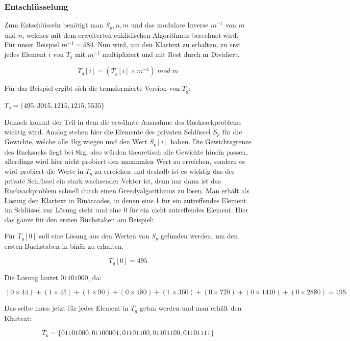 \documentclass[a4paper,12pt,titlepage]{article}
\begin{document}
\subsubsection{Entschlüsselung}
Zum Entschlüsseln benötigt man $S_p,n,m$ und das modulare Inverse $m^{-1}$ von $m$ und $n$, welches mit dem erweiterten euklidischen Algorithmus berechnet wird.
Für unser Beispiel $m^{-1} = 584$.
Nun wird, um den Klartext zu erhalten, zu erst jedes Element $i$ von $T_g$ mit $m^{-1}$ multipliziert und mit Rest durch m Dividiert.
\begin{center}
\[T_g[i] = (T_g[i] \times m^{-1})\; mod \; m\]
\end{center}
Für das Beispiel ergibt sich die transformierte Version von $T_g$:
\begin{center}
$T_g=\{495,3015,1215,1215,5535\}$
\end{center}
Danach kommt der Teil in dem die erwähnte Ausnahme des Rucksackproblems wichtig wird.
Analog stehen hier die Elemente des privaten Schlüssel $S_p$ für die Gewichte, welche alle 1kg wiegen und den Wert $S_p[i]$ haben. Die Gewichtsgrenze des Rucksacks liegt bei 8kg, also würden theoretisch alle Gewichte hinein passen, allerdings wird hier nicht probiert den maximalen Wert zu erreichen, sondern es wird probiert die Werte in $T_g$ zu erreichen und deshalb ist es wichtig das der private Schlüssel ein stark wachsender Vektor ist, denn nur dann ist das Rucksackproblem schnell durch einen Greedyalgorithmus zu lösen. Man erhält als Lösung den Klartext in Binärcodes, in denen eine 1 für ein zutreffendes Element im Schlüssel zur Lösung steht und eine 0 für ein nicht zutreffendes Element. \newline Hier das ganze für den ersten Buchstaben am Beispiel:
\begin{center}
\begin{flushleft}
Für $T_g[0]$ soll eine Lösung aus den Werten von $S_p$ gefunden werden, um den ersten Buchstaben in binär zu erhalten.
\end{flushleft}
\[T_g[0] = 495\]
\begin{flushleft}
Die Lösung lautet $01101000$, da:
\end{flushleft}
\[(0 \times 44) + (1 \times 45) + (1 \times 90) + (0 \times 180) + (1 \times 360)  + (0 \times 720 )+ (0 \times 1440 )+ (0 \times 2880) = 495\]

\begin{flushleft}
Das selbe muss jetzt für jedes Element in $T_g$ getan werden und man erhält den Klartext:
\end{flushleft}

\[T_k = \{01101000, 01100001, 01101100, 01101100, 01101111\}\]

\end{center}
\end{document}
